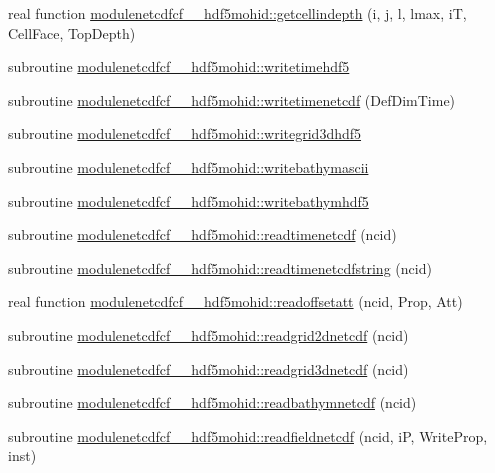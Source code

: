 \begin{DoxyCompactItemize}
real function \mbox{\hyperlink{namespacemodulenetcdfcf__2__hdf5mohid_ac801b4c359021fc9e8880497aa5fc5d6}{modulenetcdfcf\+\_\+\_\+hdf5mohid\+::getcellindepth}} (i, j, l, lmax, iT, Cell\+Face, Top\+Depth)
\item 
subroutine \mbox{\hyperlink{namespacemodulenetcdfcf__2__hdf5mohid_ac7924022182350a5df92f593c9dd7c76}{modulenetcdfcf\+\_\+\_\+hdf5mohid\+::writetimehdf5}}
\item 
subroutine \mbox{\hyperlink{namespacemodulenetcdfcf__2__hdf5mohid_a4a79edecc3020a71ece2ef3223da1024}{modulenetcdfcf\+\_\+\_\+hdf5mohid\+::writetimenetcdf}} (Def\+Dim\+Time)
\item 
subroutine \mbox{\hyperlink{namespacemodulenetcdfcf__2__hdf5mohid_ab6beeef80ab10e31564937dcd13306eb}{modulenetcdfcf\+\_\+\_\+hdf5mohid\+::writegrid3dhdf5}}
\item 
subroutine \mbox{\hyperlink{namespacemodulenetcdfcf__2__hdf5mohid_a0b860e380cd54020433bfe0ed0f27126}{modulenetcdfcf\+\_\+\_\+hdf5mohid\+::writebathymascii}}
\item 
subroutine \mbox{\hyperlink{namespacemodulenetcdfcf__2__hdf5mohid_aaf89f5e8bf98ca1365b3c0074c36f8ba}{modulenetcdfcf\+\_\+\_\+hdf5mohid\+::writebathymhdf5}}
\item 
subroutine \mbox{\hyperlink{namespacemodulenetcdfcf__2__hdf5mohid_a734d453ab8aa9e07adc4f367336f1875}{modulenetcdfcf\+\_\+\_\+hdf5mohid\+::readtimenetcdf}} (ncid)
\item 
subroutine \mbox{\hyperlink{namespacemodulenetcdfcf__2__hdf5mohid_a3208523531a4e193ad1b485436dad44a}{modulenetcdfcf\+\_\+\_\+hdf5mohid\+::readtimenetcdfstring}} (ncid)
\item 
real function \mbox{\hyperlink{namespacemodulenetcdfcf__2__hdf5mohid_a8d090e0ec216dae90d409d416fd150dd}{modulenetcdfcf\+\_\+\_\+hdf5mohid\+::readoffsetatt}} (ncid, Prop, Att)
\item 
subroutine \mbox{\hyperlink{namespacemodulenetcdfcf__2__hdf5mohid_a551caefae44a438a2446fd263b4b51e7}{modulenetcdfcf\+\_\+\_\+hdf5mohid\+::readgrid2dnetcdf}} (ncid)
\item 
subroutine \mbox{\hyperlink{namespacemodulenetcdfcf__2__hdf5mohid_a6fedd55132323077153e16ddf06c3fc1}{modulenetcdfcf\+\_\+\_\+hdf5mohid\+::readgrid3dnetcdf}} (ncid)
\item 
subroutine \mbox{\hyperlink{namespacemodulenetcdfcf__2__hdf5mohid_af7f83fb951c020a987c7376d899f56e1}{modulenetcdfcf\+\_\+\_\+hdf5mohid\+::readbathymnetcdf}} (ncid)
\item 
subroutine \mbox{\hyperlink{namespacemodulenetcdfcf__2__hdf5mohid_ac66f8e687cb8a5fe1cb48f9f02300915}{modulenetcdfcf\+\_\+\_\+hdf5mohid\+::readfieldnetcdf}} (ncid, iP, Write\+Prop, inst)

\end{DoxyCompactItemize}
